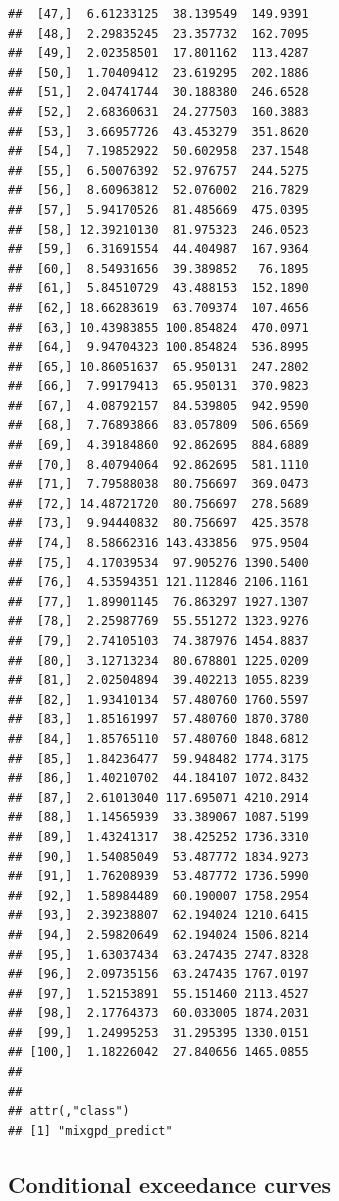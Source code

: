 \documentclass[article]{jss}\usepackage[]{graphicx}\usepackage[]{xcolor}
\makeatletter
\newenvironment{kframe}{%
 \def\at@end@of@kframe{}%
 \ifinner\ifhmode%
  \def\at@end@of@kframe{\end{minipage}}%
  \begin{minipage}{\columnwidth}%
 \fi\fi%
 \def\FrameCommand##1{\hskip\@totalleftmargin \hskip-\fboxsep
 \colorbox{shadecolor}{##1}\hskip-\fboxsep
     \hskip-\linewidth \hskip-\@totalleftmargin \hskip\columnwidth}%
 \MakeFramed {\advance\hsize-\width
   \@totalleftmargin\z@ \linewidth\hsize
   \@setminipage}}%
 {\par\unskip\endMakeFramed%
 \at@end@of@kframe}
\newenvironment{knitrout}{}{} %
\makeatother
\begin{document}
\begin{knitrout}
\begin{kframe}
\begin{verbatim}
##  [47,]  6.61233125  38.139549  149.9391
##  [48,]  2.29835245  23.357732  162.7095
##  [49,]  2.02358501  17.801162  113.4287
##  [50,]  1.70409412  23.619295  202.1886
##  [51,]  2.04741744  30.188380  246.6528
##  [52,]  2.68360631  24.277503  160.3883
##  [53,]  3.66957726  43.453279  351.8620
##  [54,]  7.19852922  50.602958  237.1548
##  [55,]  6.50076392  52.976757  244.5275
##  [56,]  8.60963812  52.076002  216.7829
##  [57,]  5.94170526  81.485669  475.0395
##  [58,] 12.39210130  81.975323  246.0523
##  [59,]  6.31691554  44.404987  167.9364
##  [60,]  8.54931656  39.389852   76.1895
##  [61,]  5.84510729  43.488153  152.1890
##  [62,] 18.66283619  63.709374  107.4656
##  [63,] 10.43983855 100.854824  470.0971
##  [64,]  9.94704323 100.854824  536.8995
##  [65,] 10.86051637  65.950131  247.2802
##  [66,]  7.99179413  65.950131  370.9823
##  [67,]  4.08792157  84.539805  942.9590
##  [68,]  7.76893866  83.057809  506.6569
##  [69,]  4.39184860  92.862695  884.6889
##  [70,]  8.40794064  92.862695  581.1110
##  [71,]  7.79588038  80.756697  369.0473
##  [72,] 14.48721720  80.756697  278.5689
##  [73,]  9.94440832  80.756697  425.3578
##  [74,]  8.58662316 143.433856  975.9504
##  [75,]  4.17039534  97.905276 1390.5400
##  [76,]  4.53594351 121.112846 2106.1161
##  [77,]  1.89901145  76.863297 1927.1307
##  [78,]  2.25987769  55.551272 1323.9276
##  [79,]  2.74105103  74.387976 1454.8837
##  [80,]  3.12713234  80.678801 1225.0209
##  [81,]  2.02504894  39.402213 1055.8239
##  [82,]  1.93410134  57.480760 1760.5597
##  [83,]  1.85161997  57.480760 1870.3780
##  [84,]  1.85765110  57.480760 1848.6812
##  [85,]  1.84236477  59.948482 1774.3175
##  [86,]  1.40210702  44.184107 1072.8432
##  [87,]  2.61013040 117.695071 4210.2914
##  [88,]  1.14565939  33.389067 1087.5199
##  [89,]  1.43241317  38.425252 1736.3310
##  [90,]  1.54085049  53.487772 1834.9273
##  [91,]  1.76208939  53.487772 1736.5990
##  [92,]  1.58984489  60.190007 1758.2954
##  [93,]  2.39238807  62.194024 1210.6415
##  [94,]  2.59820649  62.194024 1506.8214
##  [95,]  1.63037434  63.247435 2747.8328
##  [96,]  2.09735156  63.247435 1767.0197
##  [97,]  1.52153891  55.151460 2113.4527
##  [98,]  2.17764373  60.033005 1874.2031
##  [99,]  1.24995253  31.295395 1330.0151
## [100,]  1.18226042  27.840656 1465.0855
## 
## 
## attr(,"class")
## [1] "mixgpd_predict"
\end{verbatim}
\end{kframe}
\end{knitrout}

\subsection{Conditional exceedance curves}
\end{document}
